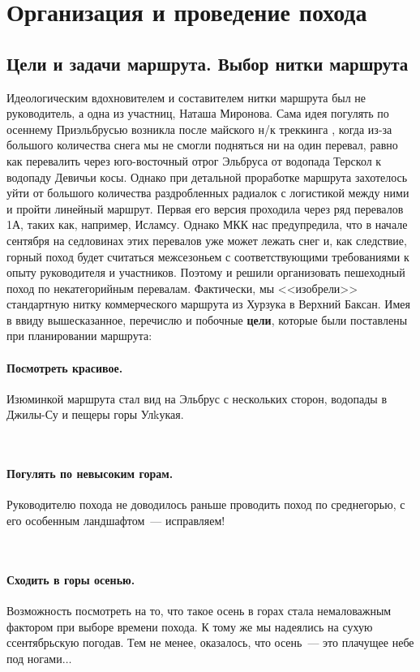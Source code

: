 \section{Организация и проведение похода}
\subsection{Цели и задачи маршрута. Выбор нитки маршрута}
Идеологическим вдохновителем и составителем нитки маршрута был не руководитель, а одна из участниц, Наташа Миронова. Сама идея погулять по осеннему Приэльбрусью возникла после майского н/к треккинга \cite{ostapiv2025}, когда из-за большого количества снега мы не смогли подняться ни на один перевал, равно как перевалить через юго-восточный отрог Эльбруса от водопада Терскол к водопаду Девичьи косы. Однако при детальной проработке маршрута захотелось уйти от большого количества раздробленных радиалок с логистикой между ними и пройти линейный маршрут. Первая его версия проходила через ряд перевалов 1А, таких как, например, Исламсу. Однако МКК нас предупредила, что в начале сентября на седловинах этих перевалов уже может лежать снег и, как следствие, горный поход будет считаться межсезоньем с соответствующими требованиями к опыту руководителя и участников. Поэтому и решили организовать пешеходный поход по некатегорийным перевалам. Фактически, мы <<изобрели>> стандартную нитку коммерческого маршрута из Хурзука в Верхний Баксан. Имея в ввиду вышесказанное, перечислю и побочные \textbf{цели}, которые были поставлены при планировании маршрута:

\paragraph{﻿﻿Посмотреть красивое.} Изюминкой маршрута стал вид на Эльбрус с нескольких сторон, водопады в Джилы-Су и пещеры горы Улkукая.

﻿﻿\paragraph{﻿﻿Погулять по невысоким горам.} Руководителю похода не доводилось раньше проводить поход по среднегорью, с его особенным ландшафтом~--- исправляем!
	
	
﻿﻿\paragraph{﻿﻿Сходить в горы осенью.} Возможность посмотреть на то, что такое осень в горах стала немаловажным фактором при выборе времени похода. К тому же мы надеялись на сухую ссентябрьскую погодав. Тем не менее, оказалось, что осень~--- это плачущее небе под ногами$\ldots$

